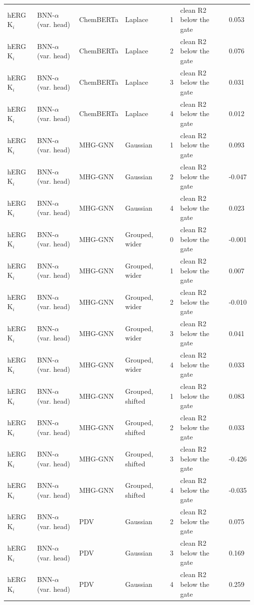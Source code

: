 {\begin{longtable}{llllcll}
hERG K$_i$ & BNN-$\alpha$ (var. head) & ChemBERTa & Laplace & 1 & clean R2 below the gate & 0.053 \\
hERG K$_i$ & BNN-$\alpha$ (var. head) & ChemBERTa & Laplace & 2 & clean R2 below the gate & 0.076 \\
hERG K$_i$ & BNN-$\alpha$ (var. head) & ChemBERTa & Laplace & 3 & clean R2 below the gate & 0.031 \\
hERG K$_i$ & BNN-$\alpha$ (var. head) & ChemBERTa & Laplace & 4 & clean R2 below the gate & 0.012 \\
hERG K$_i$ & BNN-$\alpha$ (var. head) & MHG-GNN & Gaussian & 1 & clean R2 below the gate & 0.093 \\
hERG K$_i$ & BNN-$\alpha$ (var. head) & MHG-GNN & Gaussian & 2 & clean R2 below the gate & -0.047 \\
hERG K$_i$ & BNN-$\alpha$ (var. head) & MHG-GNN & Gaussian & 4 & clean R2 below the gate & 0.023 \\
hERG K$_i$ & BNN-$\alpha$ (var. head) & MHG-GNN & Grouped, wider & 0 & clean R2 below the gate & -0.001 \\
hERG K$_i$ & BNN-$\alpha$ (var. head) & MHG-GNN & Grouped, wider & 1 & clean R2 below the gate & 0.007 \\
hERG K$_i$ & BNN-$\alpha$ (var. head) & MHG-GNN & Grouped, wider & 2 & clean R2 below the gate & -0.010 \\
hERG K$_i$ & BNN-$\alpha$ (var. head) & MHG-GNN & Grouped, wider & 3 & clean R2 below the gate & 0.041 \\
hERG K$_i$ & BNN-$\alpha$ (var. head) & MHG-GNN & Grouped, wider & 4 & clean R2 below the gate & 0.033 \\
hERG K$_i$ & BNN-$\alpha$ (var. head) & MHG-GNN & Grouped, shifted & 1 & clean R2 below the gate & 0.083 \\
hERG K$_i$ & BNN-$\alpha$ (var. head) & MHG-GNN & Grouped, shifted & 2 & clean R2 below the gate & 0.033 \\
hERG K$_i$ & BNN-$\alpha$ (var. head) & MHG-GNN & Grouped, shifted & 3 & clean R2 below the gate & -0.426 \\
hERG K$_i$ & BNN-$\alpha$ (var. head) & MHG-GNN & Grouped, shifted & 4 & clean R2 below the gate & -0.035 \\
hERG K$_i$ & BNN-$\alpha$ (var. head) & PDV & Gaussian & 2 & clean R2 below the gate & 0.075 \\
hERG K$_i$ & BNN-$\alpha$ (var. head) & PDV & Gaussian & 3 & clean R2 below the gate & 0.169 \\
hERG K$_i$ & BNN-$\alpha$ (var. head) & PDV & Gaussian & 4 & clean R2 below the gate & 0.259 \\

\end{longtable}}
